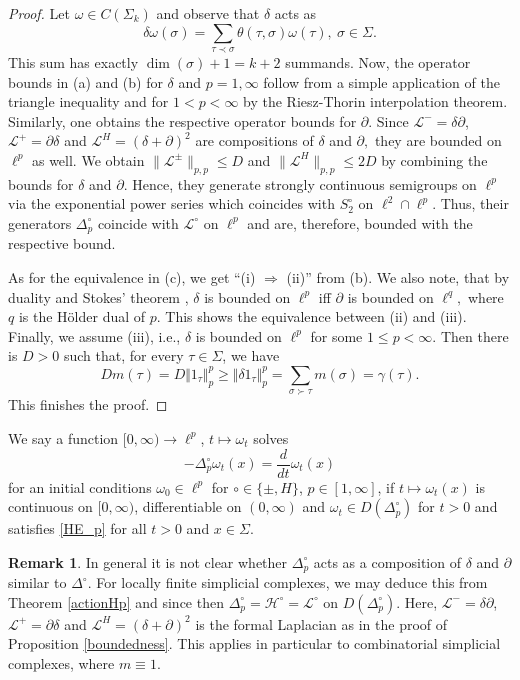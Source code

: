 \documentclass[10pt]{amsart}
\theoremstyle{definition}
\newtheorem*{remark}{Remark}
\begin{document}
\begin{proof}
Let $\omega\in C(\Sigma_k)$ and observe that $\delta$ acts as \[\delta\omega(\sigma) = \sum_{\tau\prec\sigma}\theta(\tau,\sigma)\omega(\tau),~\sigma\in\Sigma.\] This sum has exactly $\dim(\sigma)+1 = k+2$ summands. Now, the operator bounds in (a) and (b) for $\delta$ and $p = 1,\infty$ follow from a simple application of the triangle inequality and for $1<p<\infty$ by the Riesz-Thorin interpolation theorem. Similarly, one obtains the respective operator bounds for $\partial.$ Since $\mathcal{L}^{-}=\delta\partial$, $\mathcal{L}^{+}=\partial\delta$ and $\mathcal{L}^{H}=(\delta+\partial)^2$ are compositions of $\delta$ and $\partial,$ 
they are bounded on $\ell^p$ as well. We obtain $\|\mathcal{L}^\pm\|_{p,p}\leq D$ and $\|\mathcal{L}^H\|_{p,p}\leq 2D$ by combining the bounds for $\delta$ and $\partial$. Hence, they generate  strongly continuous semigroups on $\ell^p$ via the exponential power series which coincides with $S_2^\circ$ on $\ell^2\cap\ell^p$. Thus, their generators $\Delta^\circ_p$ coincide with $\mathcal{L}^\circ$ on $\ell^p$ and are, therefore, bounded with the respective bound.


As for the equivalence in (c), we get ``(i) $\Rightarrow$ (ii)'' from (b). We also note, that by duality and Stokes' theorem \cite[Theorem 2.9]{BK}, $\delta$ is bounded on $\ell^p$ iff $\partial$ is bounded on $\ell^q,$ where $q$ is the H\"older dual of $p.$ This shows the equivalence between (ii) and (iii). 
 Finally, we assume (iii), i.e., $\delta$ is bounded on $\ell^p$ for some $1\leq p<\infty.$ Then there is $D>0$ such that, for every $\tau\in \Sigma$, we have 
 \[Dm(\tau) = D\Vert 1_\tau\Vert_p^p\geq \Vert\delta 1_\tau\Vert_p^p = \sum_{\sigma\succ\tau}m(\sigma) = \gamma(\tau).\]
 This finishes the proof.
\end{proof}


 
We say a  function
$[0,\infty)\rightarrow \ell^p$, $t\mapsto \omega_t$  solves 
\begin{equation} \tag{HE$^\circ$} \label{HE_p}
     -\Delta^\circ_p \omega_t (x)= \frac{d}{dt}\omega_t(x)     
\end{equation}
for an initial conditions $\omega_0\in\ell^p$  for $\circ\in \{\pm,H\}$, $p\in [1,\infty]$, if $t\mapsto \omega_t(x)$ is  continuous on $[0,\infty)$, differentiable on $(0,\infty)$ and $\omega_t\in D(\Delta_p^\circ)$ for $t>0$ and satisfies 
\eqref{HE_p}  for all $t>0$ and $x\in \Sigma$.
\begin{remark}
    In general it is not clear whether $\Delta^\circ_p$ acts as a composition of $\delta$ and $\partial$ similar to $\Delta^\circ.$ For locally finite simplicial complexes, we may deduce this from Theorem \ref{actionHp} and \cite[Theorem 3.12]{BK} since then $\Delta^\circ_p = \mathcal{H}^\circ = \mathcal{L}^\circ$ on $D(\Delta^\circ_p).$ Here, $\mathcal{L}^{-}=\delta\partial$, $\mathcal{L}^{+}=\partial\delta$ and $\mathcal{L}^{H}=(\delta+\partial)^2$ is the formal Laplacian as in the proof of  Proposition \ref{boundedness}. This applies in particular to combinatorial simplicial complexes, where $m\equiv 1.$
\end{remark}
\end{document}
